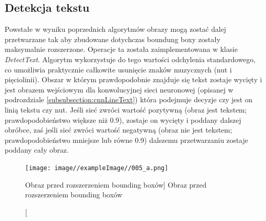 \documentclass[a4paper,12pt]{article}
\newcommand\spacingIndent{2.2em}
\begin{document}
            
		
		\subsection{Detekcja tekstu} 		
			\hspace{\spacingIndent}  
			Powstałe w wyniku poprzednich algorytmów obrazy mogą zostać dalej przetwarzane tak aby zbudowane dotychczas boundung boxy zostały maksymalnie rozszerzone. Operacje ta została zaimplementowana w klasie \textit{DetectText}. 
			Algorytm wykorzystuje do tego wartości odchylenia standardowego, co       umożliwia praktycznie całkowite usunięcie znaków muzycznych (nut i        pięciolinii). Obszar w którym prawdopodobnie znajduje się tekst
			zostaje     wycięty i jest obrazem wejściowym dla konwolucyjnej sieci neuronowej (opisanej w podrozdziale \ref{subsubsection:cnnLineText})       która podejmuje decyzje czy jest on linią tekstu czy nut. Jeśli sieć        zwróci wartość pozytywną (obraz jest tekstem; prawdopodobieństwo większe     niż 0.9), zostaje on wycięty i poddany dalszej obróbce, zaś jeśli sieć       zwróci wartość negatywną (obraz nie jest tekstem; prawdopodobieństwo        mniejsze lub równe 0.9) dalszemu przetwarzaniu zostaje poddany cały         obraz.  

			    \begin{figure}[!ht]  
			        \begin{center}
				        \texttt{[image: image//exampleImage//005\_a.png]} 
			        \end{center}
			        \caption
    			        [Obraz przed rozszerzeniem bounding boxów]  
    			        {Obraz przed rozszerzeniem bounding boxów} 
		        \end{figure} 
		
\end{document}
